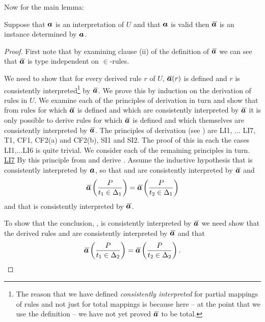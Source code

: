Now for the main lemma:
\begin{lemma}
Suppose that $\iI$ is an interpretation of $U$  and that $\iI$ is valid  then $\Ibar$ is an instance determined by $\iI$.
\end{lemma}
\begin{proof} 
\newcommand {\forceSOURCEwidth}{\rule{5cm}{0pt}}  %
\newcommand {\forceTARGETwidth}{\rule{2.2cm}{0pt}}
First note that by examining clause (ii) of the definition of $\Ibar$ we can see that $\Ibar$ is  type independent 
on $\in$-rules. 

We need to show that for every derived rule $r$ of $U$, $\Ibar(r)$ is defined and $r$ 
is consistently interpreted\footnote{The reason that we have defined
\textit{consistently interpreted} for partial mappings of rules and not just for total mappings is because  here -- at the point that we use the definition -- we have not yet proved $\Ibar$ to be total.} by $\Ibar$. 
We prove this by induction on the derivation of rules in $U$. We examine each of the principles of derivation in turn
and show that from rules for which $\Ibar$ is defined and which are consistently interpreted by $\Ibar$ 
it is only possible to derive rules for which $\Ibar$ is defined and which themselves are consistently interpreted by $\Ibar$.
The principles of derivation (see \cite{Cartmell86}) are LI1, ... LI7, T1, CF1, CF2(a) and CF2(b), SI1 and SI2. 
The proof of this  in each the cases  LI1,...LI6 is quite trivial. We consider each of the remaining principles in turn. 
 \\
\underline{LI7} 
By this principle from  and  derive
. 
Assume the inductive hypothesis that  is consistently interpreted by $\iI$,
so that
 and
 are consistently interpreted by $\Ibar$
and  
\begin{equation}
\label{LI7t1t2delta1}
\ibarmappedrule{P}{\ofT{t_1}{\Delta_1}}=\ibarmappedrule{P}{\ofT{t_2}{\Delta_1}}
\end{equation}
and that  is consistently interpreted by $\Ibar$.

To show that the conclusion, , is consistently interpreted by $\Ibar$ we need show that the derived rules 
 and
 are consistently interpreted by $\Ibar$
and that 
\begin{equation}
\label{LI7t1t2delta2}
\ibarmappedrule{P}{\ofT{t_1}{\Delta_2}}=\ibarmappedrule{P}{\ofT{t_2}{\Delta_2}}.
\end{equation}
 

\end{proof}
